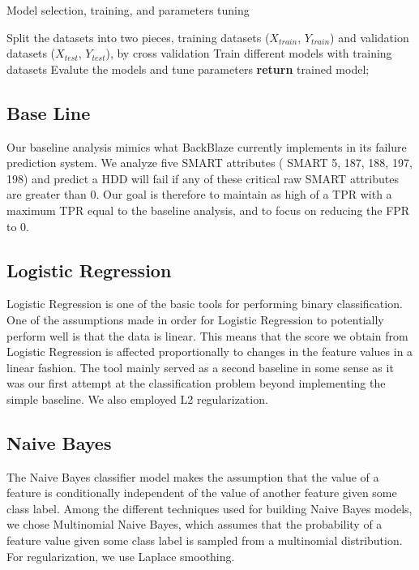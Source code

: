 \documentclass[12pt,a4paper,english]{amsart}
\begin{document}
\begin{algorithm}  
	\caption{Model selection, training, and parameters tuning}
	\LinesNumbered  
	Split the datasets into two pieces, training datasets ($X_{train}$, $Y_{train}$) and validation datasets ($X_{test}$, $Y_{test}$), by cross validation\;
	Train different models with training datasets\;
	{
		Evalute the models and tune parameters\;
	}
	\textbf{return} trained model;
\end{algorithm}  

\subsection*{Base Line}

Our baseline analysis mimics what BackBlaze currently implements in its failure prediction system. We analyze five SMART attributes ( SMART 5, 187, 188, 197, 198) and predict a HDD will fail if any of these critical raw SMART   attributes   are   greater   than   0.
Our goal is therefore to maintain as high of a TPR with a maximum TPR equal to the baseline analysis, and to focus   on   reducing   the   FPR   to   0.

\subsection*{Logistic Regression}

Logistic Regression is one of the basic tools for performing binary classification. One of the assumptions made in order for Logistic Regression to potentially perform well is that the data is linear. This means that the score we obtain from Logistic Regression is affected proportionally to changes in the feature values in a linear fashion. The tool mainly served as a second baseline in some sense as it was our first attempt at the classification problem beyond implementing   the   simple   baseline.   We   also   employed   L2   regularization.

\subsection*{Naive Bayes}

The Naive Bayes classifier model makes the assumption that the value of a feature is conditionally independent of the value of another feature given some class label. Among the different techniques used for building Naive Bayes models, we chose Multinomial Naive Bayes, which assumes that the probability of a feature value given some class label   is   sampled   from   a   multinomial   distribution.   For   regularization,   we   use   Laplace   smoothing.
\end{document}
